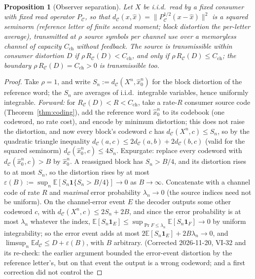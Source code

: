 \documentclass[11pt]{article}
\newtheorem{proposition}{Proposition}
\theoremstyle{definition}
\theoremstyle{remark}
\newcommand{\PC}{P_{\mathcal{C}}}
\newcommand{\E}{\mathbb{E}}
\begin{document}
\begin{proposition}[Observer separation]\label{prop:separation}
Let $X$ be i.i.d.\ read by a fixed consumer with fixed read operator $\PC$, so that
$d_{\mathcal C}(x,\hat x)=\lVert\PC^{1/2}(x-\hat x)\rVert^2$ is a squared seminorm (reference
letter of finite second moment; block distortion the per-letter average), transmitted at
$\rho$ source symbols per channel use over
a memoryless channel of capacity $C_{\mathrm{ch}}$ without feedback. The source is
transmissible within consumer distortion $D$ if $\rho\,R_{\mathcal C}(D)<C_{\mathrm{ch}}$,
and only if $\rho\,R_{\mathcal C}(D)\le C_{\mathrm{ch}}$; the boundary
$\rho\,R_{\mathcal C}(D)=C_{\mathrm{ch}}>0$ is transmissible too.
\end{proposition}
\begin{proof}
Take $\rho=1$, and write $S_n:=d_{\mathcal C}(X^n,\hat x_0^n)$ for the block distortion
of the reference word; the $S_n$ are averages of i.i.d.\ integrable variables, hence
uniformly integrable. \emph{Forward:} for $R_{\mathcal C}(D)<R<C_{\mathrm{ch}}$, take a
rate-$R$ consumer source code (Theorem~\ref{thm:coding}), add the reference word
$\hat x_0^n$ to its codebook (one codeword, no rate cost), and encode by minimum
distortion; this does not raise the distortion, and now every block's codeword $c$ has
$d_{\mathcal C}(X^n,c)\le S_n$, so by the quadratic triangle inequality
$d_{\mathcal C}(a,c)\le2d_{\mathcal C}(a,b)+2d_{\mathcal C}(b,c)$ (valid for the squared
seminorm) $d_{\mathcal C}(\hat x_0^n,c)\le4S_n$. Expurgate: replace every codeword with
$d_{\mathcal C}(\hat x_0^n,c)>B$ by $\hat x_0^n$. A reassigned block has $S_n>B/4$, and its
distortion rises to at most $S_n$, so the distortion rises by at most
$\varepsilon(B):=\sup_n\E[S_n\mathbf 1\{S_n>B/4\}]\to0$ as $B\to\infty$. Concatenate with a
channel code of rate $R$ and \emph{maximal} error probability $\lambda_n\to0$ (the source
indices need not be uniform). On the channel-error event $E$ the decoder outputs some other
codeword $c$, with $d_{\mathcal C}(X^n,c)\le2S_n+2B$, and since the error probability is
at most $\lambda_n$ whatever the index, $\E[S_n\mathbf 1_E]\le\sup_{\Pr F\le\lambda_n}\E[S_n
\mathbf 1_F]\to0$ by uniform integrability; so the error event adds at most
$2\E[S_n\mathbf 1_E]+2B\lambda_n\to0$, and $\limsup_n\E d_{\mathcal C}\le
D+\varepsilon(B)$, with $B$ arbitrary. (Corrected 2026-11-20, VI-32 and its re-check: the
earlier argument bounded the error-event distortion by the reference letter's, but on that
event the output is a wrong codeword; and a first correction did not control the

\end{proof}
\end{document}
